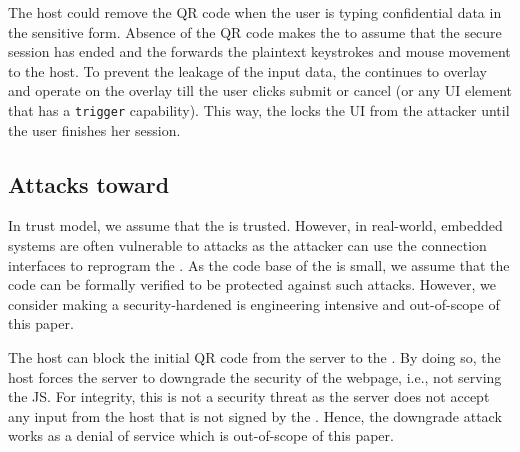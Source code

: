  The host could remove the QR code when the user is typing confidential data in the sensitive form. Absence of the QR code makes the \device to assume that the secure session has ended and the \device forwards the plaintext keystrokes and mouse movement to the host. To prevent the leakage of the input data, the \device continues to overlay and operate on the overlay till the user clicks submit or cancel (or any UI element that has a \texttt{trigger}  capability). This way, the \device locks the UI from the attacker until the user finishes her session.

\subsection{Attacks toward \device} 
\label{sec:securityAnalysis:device}

In \name trust model, we assume that the \device is trusted. However, in real-world, embedded systems are often vulnerable to attacks as the attacker can use the connection interfaces to reprogram the \device. 
As the code base of the \device is small, we assume that the code can be formally verified to be protected against such attacks. However, we consider making a security-hardened \device is engineering intensive and out-of-scope of this paper. 


 The host can block the initial QR code from the server to the \device. By doing so, the host forces the server to downgrade the security of the webpage, i.e., not serving the \name JS. For integrity, this is not a security threat as the server does not accept any input from the host that is not signed by the \device. Hence, the downgrade attack works as a denial of service which is out-of-scope of this paper.

